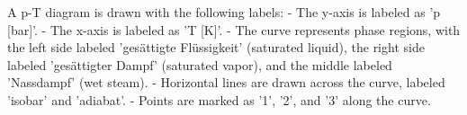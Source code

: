 A p-T diagram is drawn with the following labels:  
- The y-axis is labeled as 'p [bar]'.  
- The x-axis is labeled as 'T [K]'.  
- The curve represents phase regions, with the left side labeled 'gesättigte Flüssigkeit' (saturated liquid), the right side labeled 'gesättigter Dampf' (saturated vapor), and the middle labeled 'Nassdampf' (wet steam).  
- Horizontal lines are drawn across the curve, labeled 'isobar' and 'adiabat'.  
- Points are marked as '1', '2', and '3' along the curve.